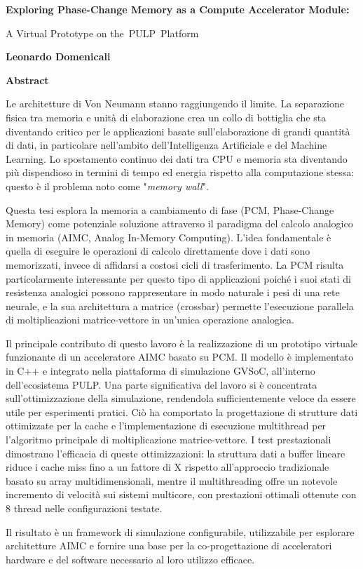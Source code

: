 \thispagestyle{plain}
\begin{center}
    \Large
    \textbf{Exploring Phase-Change Memory as a Compute Accelerator Module:}
        
    \vspace{0.4cm}
    \large
    A Virtual Prototype on the PULP Platform
        
    \vspace{0.4cm}
    \textbf{Leonardo Domenicali}
       
    \vspace{0.9cm}
    \textbf{Abstract}
\end{center}

Le architetture di Von Neumann stanno raggiungendo il limite.
La separazione fisica tra memoria e unità di elaborazione crea un collo di bottiglia che sta diventando critico per le applicazioni basate sull'elaborazione di grandi quantità di dati, in particolare nell'ambito dell'Intelligenza Artificiale e del Machine Learning.
Lo spostamento continuo dei dati tra CPU e memoria sta diventando più dispendioso in termini di tempo ed energia rispetto alla computazione stessa: questo è il problema noto come "\textit{memory wall}".

Questa tesi esplora la memoria a cambiamento di fase (PCM, Phase-Change Memory) come potenziale soluzione attraverso il paradigma del calcolo analogico in memoria (AIMC, Analog In-Memory Computing).
L'idea fondamentale è quella di eseguire le operazioni di calcolo direttamente dove i dati sono memorizzati, invece di affidarsi a costosi cicli di trasferimento.
La PCM risulta particolarmente interessante per questo tipo di applicazioni poiché i suoi stati di resistenza analogici possono rappresentare in modo naturale i pesi di una rete neurale, e la sua architettura a matrice (crossbar) permette l'esecuzione parallela di moltiplicazioni matrice-vettore in un'unica operazione analogica.

Il principale contributo di questo lavoro è la realizzazione di un prototipo virtuale funzionante di un acceleratore AIMC basato su PCM.
Il modello è implementato in C++ e integrato nella piattaforma di simulazione GVSoC, all'interno dell'ecosistema PULP.
Una parte significativa del lavoro si è concentrata sull'ottimizzazione della simulazione, rendendola sufficientemente veloce da essere utile per esperimenti pratici.
Ciò ha comportato la progettazione di strutture dati ottimizzate per la cache e l'implementazione di esecuzione multithread per l'algoritmo principale di moltiplicazione matrice-vettore.
I test prestazionali dimostrano l'efficacia di queste ottimizzazioni: la struttura dati a buffer lineare riduce i cache miss fino a un fattore di X rispetto all'approccio tradizionale basato su array multidimensionali, mentre il multithreading offre un notevole incremento di velocità sui sistemi multicore, con prestazioni ottimali ottenute con 8 thread nelle configurazioni testate.

Il risultato è un framework di simulazione configurabile, utilizzabile per esplorare architetture AIMC e fornire una base per la co-progettazione di acceleratori hardware e del software necessario al loro utilizzo efficace.